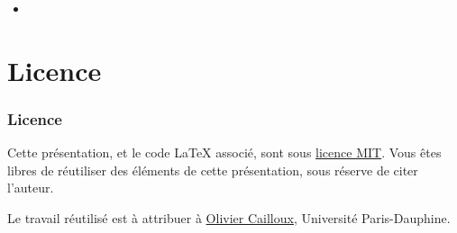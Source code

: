 \documentclass[english, french]{beamer}
\begin{document}
\begin{frame}
	\frametitle{}
	\begin{itemize}
		\item 
	\end{itemize}
\end{frame}

\appendix

\section{Licence}
\begin{frame}
	\frametitle{Licence}
	Cette présentation, et le code LaTeX associé, sont sous \href{http://opensource.org/licenses/MIT}{licence MIT}. Vous êtes libres de réutiliser des éléments de cette présentation, sous réserve de citer l’auteur.
	
	Le travail réutilisé est à attribuer à \href{http://www.lamsade.dauphine.fr/~ocailloux/}{Olivier Cailloux}, Université Paris-Dauphine.
\end{frame}
\end{document}
